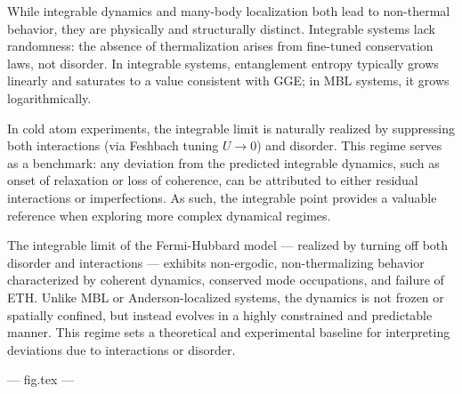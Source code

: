 While integrable dynamics and many-body localization both lead to non-thermal behavior, they are physically and structurally distinct. Integrable systems lack randomness: the absence of thermalization arises from fine-tuned conservation laws, not disorder. In integrable systems, entanglement entropy typically grows linearly and saturates to a value consistent with GGE; in MBL systems, it grows logarithmically. 

In cold atom experiments, the integrable limit is naturally realized by suppressing both interactions (via Feshbach tuning $U \to 0$) and disorder. This regime serves as a benchmark: any deviation from the predicted integrable dynamics, such as onset of relaxation or loss of coherence, can be attributed to either residual interactions or imperfections. As such, the integrable point provides a valuable reference when exploring more complex dynamical regimes.

The integrable limit of the Fermi-Hubbard model — realized by turning off both disorder and interactions — exhibits non-ergodic, non-thermalizing behavior characterized by coherent dynamics, conserved mode occupations, and failure of ETH. Unlike MBL or Anderson-localized systems, the dynamics is not frozen or spatially confined, but instead evolves in a highly constrained and predictable manner. This regime sets a theoretical and experimental baseline for interpreting deviations due to interactions or disorder.





--- fig.tex ---














